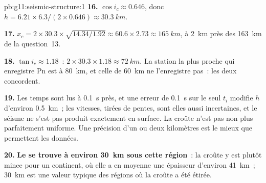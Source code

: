 \begin{solution}{pb:g11:seismic-structure:1}
\textbf{16.} $\cos i_c \approx 0.646$, donc $h = 6.21 \times 6.3/(2 \times
0.646) \approx \qty{30.3}{km}$.

\textbf{17.} $x_c = 2 \times 30.3 \times \sqrt{14.34/1.92} \approx 60.6 \times
2.73 \approx \qty{165}{km}$, à \qty{2}{km} près des \qty{163}{km}
de la question~13.

\textbf{18.} $\tan i_c \approx 1.18$~: $2 \times 30.3 \times 1.18 \approx
\qty{72}{km}$. La station la plus proche qui enregistre Pn est à
\qty{80}{km}, et celle de \qty{60}{km} ne l'enregistre pas~: les deux
concordent.

\textbf{19.} Les temps sont lus à \qty{0.1}{s} près, et une erreur de
\qty{0.1}{s} sur le seul $t_i$ modifie $h$ d'environ \qty{0.5}{km}~; les
vitesses, tirées de pentes, sont elles aussi incertaines, et le séisme ne
s'est pas produit exactement en surface. La croûte n'est pas non plus
parfaitement uniforme. Une précision d'un ou deux kilomètres est le mieux
que permettent les données.

\textbf{20.} \textbf{Le  se trouve à environ \qty{30}{km} sous cette
région}~: la croûte y est plutôt mince pour un continent, où elle a en
moyenne une épaisseur d'environ \qty{41}{km}~; \qty{30}{km} est une valeur
typique des régions où la croûte a été étirée.
\end{solution}
